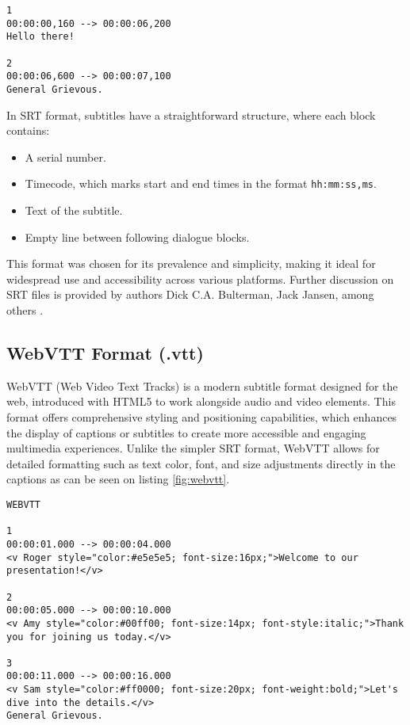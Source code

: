 \begin{clisting}
\begin{verbatim}
1
00:00:00,160 --> 00:00:06,200
Hello there!

2
00:00:06,600 --> 00:00:07,100
General Grievous.
\end{verbatim}
\end{clisting}

In SRT format, subtitles have a straightforward structure, where each block contains:
\begin{itemize}
    \item A serial number.
    \item Timecode, which marks start and end times in the format \texttt{hh:mm:ss,ms}.
    \item Text of the subtitle.
    \item Empty line between following dialogue blocks.
\end{itemize}

This format was chosen for its prevalence and simplicity, making it ideal for widespread use and accessibility across various platforms. Further discussion on SRT files is provided by authors Dick C.A. Bulterman, Jack Jansen, among others \cite{Bulterman2007DocEng}.

\subsection{WebVTT Format (.vtt)}
WebVTT (Web Video Text Tracks) is a modern subtitle format designed for the web, introduced with HTML5 to work alongside audio and video elements. This format offers comprehensive styling and positioning capabilities, which enhances the display of captions or subtitles to create more accessible and engaging multimedia experiences. Unlike the simpler SRT format, WebVTT allows for detailed formatting such as text color, font, and size adjustments directly in the captions as can be seen on listing \ref{fig:webvtt}.

\begin{clisting}
\label{fig:webvtt}
\begin{verbatim}
WEBVTT

1
00:00:01.000 --> 00:00:04.000
<v Roger style="color:#e5e5e5; font-size:16px;">Welcome to our presentation!</v>

2
00:00:05.000 --> 00:00:10.000
<v Amy style="color:#00ff00; font-size:14px; font-style:italic;">Thank you for joining us today.</v>

3
00:00:11.000 --> 00:00:16.000
<v Sam style="color:#ff0000; font-size:20px; font-weight:bold;">Let's dive into the details.</v>
General Grievous.
\end{verbatim}
\end{clisting}

